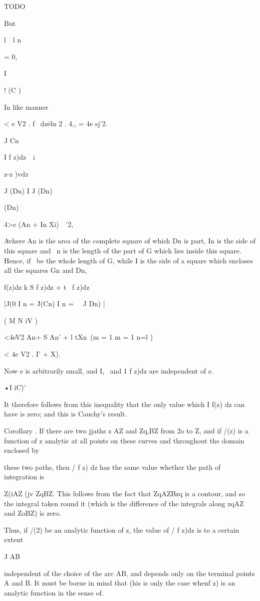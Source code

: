 TODO

But

l\ \ l n

= 0,

I

! (C )

In like manner

< e V2 . f \ dz\= eln \/2 . 4,, = 4e sj'2.

J Cn

I f z)dz\ \ i \ \ {z-z )vdz\

J (Dn) I J (Dn)

(Dn)

  4>e (An + In Xi)\ \ '2,

Avhere An is the area of the complete square of which Dn is part, In
is the side of this square and \ n is the length of the part of G
which lies inside this square. Hence, if \ be the whole length of G,
while I is the side of a square which encloses all the squares Gn and
Dn,

f(z)dz k S f z)dz + t \ f z)dz

|J(0 I n = \'J(Cn) I n = \ \ J Dn) |

( M N iV )

<4eV2 An+ S An' + l tXn\ (m = 1 m = 1 n=l )

< 4e V2 . I' + X).

Now e is arbitrarily small, and I, \ and 1 f z)dz are independent of
e.

•I iC)'

It therefore follows from this inequality that the only value which I
f(z) dz can have is zero; and this is Cauchy's result.

%
%

Corollary . If there are two jjaths z AZ and Zq,BZ from 2o to Z, and
if /(z) is a function of z analytic at all points on these curves and
throughout the domain enclosed by

these two paths, then / f z) dz has the same value whether the path of
integration is

Z(iAZ (jv ZqBZ. This follows from the fact that ZqAZBzq is a contour,
and so the integral taken round it (which is the difference of the
integrals along zqAZ and ZoBZ) is zero.

Thus, if /(2) be an analytic function of z, the value of / f z)dz is
to a certain extent

J AB

independent of the choice of the arc AB, and depends only on the
terminal points A and B. It must be borne in mind that (his is only
the case whenf z) is an analytic function in the sense of.

}
